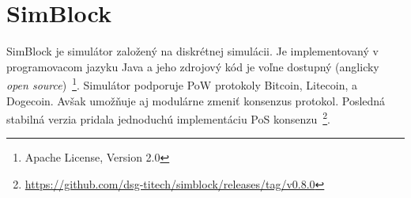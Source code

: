 


\section{SimBlock}

SimBlock je simulátor založený na diskrétnej simulácii. Je implementovaný v programovacom jazyku Java a jeho zdrojový kód je voľne dostupný (anglicky \textit{open source})~\footnote{Apache License, Version 2.0}. Simulátor podporuje PoW protokoly Bitcoin, Litecoin, a Dogecoin. Avšak umožňuje aj modulárne zmeniť konsenzus protokol. Posledná stabilná verzia pridala jednoduchú implementáciu PoS konsenzu~\footnote{\url{https://github.com/dsg-titech/simblock/releases/tag/v0.8.0}}.

